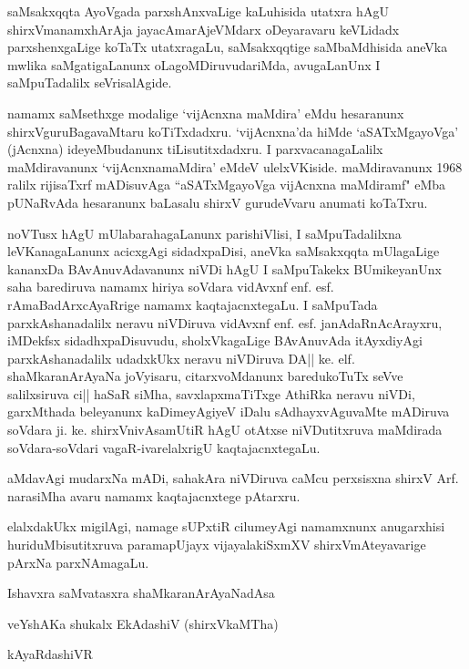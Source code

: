 saMsakxqqta AyoVgada parxshAnxvaLige kaLuhisida utatxra hAgU shirxVmanamxhArAja jayacAmarAjeVMdarx oDeyaravaru keVLidadx parxshenxgaLige koTaTx utatxragaLu, saMsakxqqtige saMbaMdhisida aneVka mwlika saMgatigaLanunx oLagoMDiruvudariMda, avugaLanUnx I saMpuTadalilx seVrisalAgide.

namamx saMsethxge modalige `vijAcnxna maMdira' eMdu hesaranunx shirxVguruBagavaMtaru koTiTxdadxru. `vijAcnxna'da hiMde `aSATxMgayoVga' (jAcnxna) ideyeMbudanunx tiLisutitxdadxru. I parxvacanagaLalilx maMdiravanunx `vijAcnxnamaMdira' eMdeV ulelxVKiside. maMdiravanunx 1968 ralilx rijisaTxrf mADisuvAga ``aSATxMgayoVga vijAcnxna maMdiramf" eMba pUNaRvAda hesaranunx baLasalu shirxV gurudeVvaru anumati koTaTxru.

noVTusx hAgU mUlabarahagaLanunx parishiVlisi, I saMpuTadalilxna leVKanagaLanunx acicxgAgi sidadxpaDisi, aneVka saMsakxqqta mUlagaLige kananxDa BAvAnuvAdavanunx niVDi hAgU I saMpuTakekx BUmikeyanUnx saha barediruva namamx hiriya soVdara vidAvxnf enf. esf. rAmaBadArxcAyaRrige namamx kaqtajacnxtegaLu. I saMpuTada parxkAshanadalilx neravu niVDiruva vidAvxnf enf. esf. janAdaRnAcArayxru, iMDekfsx sidadhxpaDisuvudu, sholxVkagaLige BAvAnuvAda itAyxdiyAgi parxkAshanadalilx udadxkUkx neravu niVDiruva DA|| ke. elf. shaMkaranArAyaNa joVyisaru, citarxvoMdanunx baredukoTuTx seVve salilxsiruva ci|| haSaR siMha, savxlapxmaTiTxge AthiRka neravu niVDi, garxMthada beleyanunx kaDimeyAgiyeV iDalu sAdhayxvAguvaMte mADiruva soVdara ji. ke. shirxVnivAsamUtiR hAgU otAtxse niVDutitxruva maMdirada soVdara-soVdari vagaR-ivarelalxrigU kaqtajacnxtegaLu.

aMdavAgi mudarxNa mADi, sahakAra niVDiruva caMcu perxsisxna shirxV Arf. narasiMha avaru namamx kaqtajacnxtege pAtarxru.

elalxdakUkx migilAgi, namage sUPxtiR cilumeyAgi namamxnunx anugarxhisi huriduMbisutitxruva paramapUjayx vijayalakiSxmXV shirxVmAteyavarige pArxNa parxNAmagaLu.

\vskip 1cm

\noindent Ishavxra saMvatasxra \hfill shaMkaranArAyaNadAsa

\noindent veYshAKa shukalx EkAdashiV \hfill (shirxVkaMTha)

 \hfill kAyaRdashiVR


